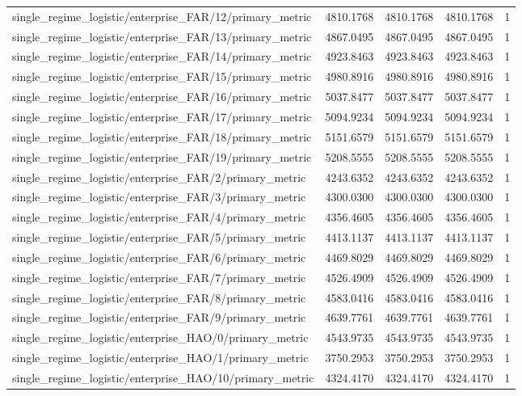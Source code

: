 \begin{table}[h]
\begin{tabular}{lrrrr}
single_regime_logistic/enterprise_FAR/12/primary_metric & 4810.1768 & 4810.1768 & 4810.1768 & 1 \\
single_regime_logistic/enterprise_FAR/13/primary_metric & 4867.0495 & 4867.0495 & 4867.0495 & 1 \\
single_regime_logistic/enterprise_FAR/14/primary_metric & 4923.8463 & 4923.8463 & 4923.8463 & 1 \\
single_regime_logistic/enterprise_FAR/15/primary_metric & 4980.8916 & 4980.8916 & 4980.8916 & 1 \\
single_regime_logistic/enterprise_FAR/16/primary_metric & 5037.8477 & 5037.8477 & 5037.8477 & 1 \\
single_regime_logistic/enterprise_FAR/17/primary_metric & 5094.9234 & 5094.9234 & 5094.9234 & 1 \\
single_regime_logistic/enterprise_FAR/18/primary_metric & 5151.6579 & 5151.6579 & 5151.6579 & 1 \\
single_regime_logistic/enterprise_FAR/19/primary_metric & 5208.5555 & 5208.5555 & 5208.5555 & 1 \\
single_regime_logistic/enterprise_FAR/2/primary_metric & 4243.6352 & 4243.6352 & 4243.6352 & 1 \\
single_regime_logistic/enterprise_FAR/3/primary_metric & 4300.0300 & 4300.0300 & 4300.0300 & 1 \\
single_regime_logistic/enterprise_FAR/4/primary_metric & 4356.4605 & 4356.4605 & 4356.4605 & 1 \\
single_regime_logistic/enterprise_FAR/5/primary_metric & 4413.1137 & 4413.1137 & 4413.1137 & 1 \\
single_regime_logistic/enterprise_FAR/6/primary_metric & 4469.8029 & 4469.8029 & 4469.8029 & 1 \\
single_regime_logistic/enterprise_FAR/7/primary_metric & 4526.4909 & 4526.4909 & 4526.4909 & 1 \\
single_regime_logistic/enterprise_FAR/8/primary_metric & 4583.0416 & 4583.0416 & 4583.0416 & 1 \\
single_regime_logistic/enterprise_FAR/9/primary_metric & 4639.7761 & 4639.7761 & 4639.7761 & 1 \\
single_regime_logistic/enterprise_HAO/0/primary_metric & 4543.9735 & 4543.9735 & 4543.9735 & 1 \\
single_regime_logistic/enterprise_HAO/1/primary_metric & 3750.2953 & 3750.2953 & 3750.2953 & 1 \\
single_regime_logistic/enterprise_HAO/10/primary_metric & 4324.4170 & 4324.4170 & 4324.4170 & 1 \\

\end{tabular}
\end{table}
